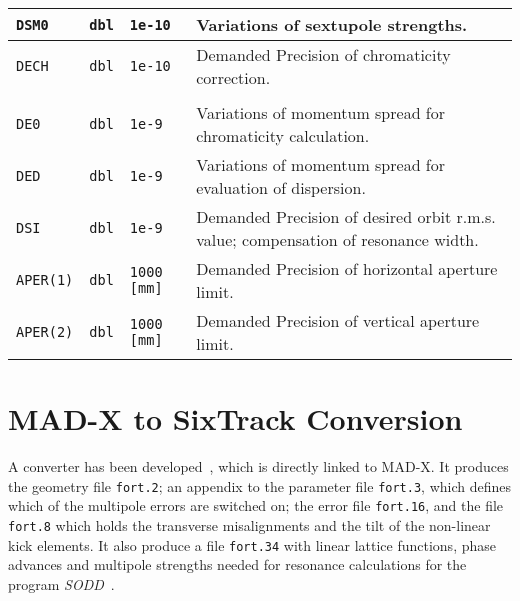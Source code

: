 \begin{table}[h]
\begin{tabular}{|l|l|l|>{\raggedright\arraybackslash}p{10.2cm}|}
        \hline
        \texttt{DSM0}  & \texttt{dbl} & \texttt{1e-10} & Variations of sextupole strengths. \\
        \hline
        \texttt{DECH}  & \texttt{dbl} & \texttt{1e-10} & Demanded Precision of chromaticity correction. \\
        \hline
        \rowcolor{gray!15}
        \multicolumn{4}{|l|}{Data Line 4} \\
        \hline
        \texttt{DE0} & \texttt{dbl} & \texttt{1e-9} & Variations of momentum spread for chromaticity calculation. \\
        \hline
        \texttt{DED} & \texttt{dbl} & \texttt{1e-9} & Variations of momentum spread for evaluation of dispersion. \\
        \hline
        \texttt{DSI} & \texttt{dbl} & \texttt{1e-9} & Demanded Precision of desired orbit r.m.s. value; compensation of resonance width. \\
        \hline
        \texttt{APER(1)} & \texttt{dbl} & \texttt{1000 [mm]} & Demanded Precision of horizontal aperture limit. \\
        \hline
        \texttt{APER(2)} & \texttt{dbl} & \texttt{1000 [mm]} & Demanded Precision of vertical aperture limit. \\
        \hline
    \end{tabular}
\end{table}

\section{MAD-X to SixTrack Conversion} \label{MADT}

A converter has been developed~\cite{CONVERTOR}, which is directly linked to MAD-X\@.
It produces the geometry file \texttt{fort.2}; an appendix to the parameter file \texttt{fort.3}, which defines which of the multipole errors are switched on; the error file \texttt{fort.16}, and the file \texttt{fort.8} which holds the transverse misalignments and the tilt of the non-linear kick elements.
It also produce a file \texttt{fort.34} with linear lattice functions, phase advances and multipole strengths needed for resonance calculations for the program \textit{SODD}~\cite{SODD}.

